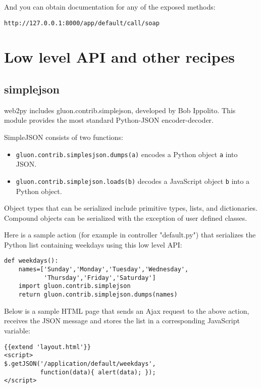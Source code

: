 \documentclass[justified,sixbynine,notoc]{tufte-book}
\def\ft{\small\tt}
\def\inxx#1{\index{#1}}
\begin{document}
\begin{fullwidth}
And you can obtain documentation for any of the exposed methods:

\begin{lstlisting}[keywords={}]
http://127.0.0.1:8000/app/default/call/soap
\end{lstlisting}

\goodbreak\section{Low level API and other recipes}

\goodbreak\subsection{simplejson}

\inxx{JSON} \inxx{simplejson}
\noindent web2py includes gluon.contrib.simplejson, developed by Bob Ippolito. This module provides the most standard Python-JSON encoder-decoder.

SimpleJSON consists of two functions:
\begin{itemize}
\item {\ft gluon.contrib.simplesjson.dumps(a)} encodes a Python object {\ft a} into JSON.

\item {\ft gluon.contrib.simplejson.loads(b)} decodes a JavaScript object {\ft b} into a Python object.
\end{itemize}

Object types that can be serialized include primitive types, lists, and dictionaries. Compound objects can be serialized with the exception of user defined classes.

Here is a sample action (for example in controller "default.py") that serializes the Python list containing weekdays using this low level API:
\begin{lstlisting}
def weekdays():
    names=['Sunday','Monday','Tuesday','Wednesday',
           'Thursday','Friday','Saturday']
    import gluon.contrib.simplejson
    return gluon.contrib.simplejson.dumps(names)
\end{lstlisting}

Below is a sample HTML page that sends an Ajax request to the above action, receives the JSON message and stores the list in a corresponding JavaScript variable:
\begin{lstlisting}[keywords={}]
{{extend 'layout.html'}}
<script>
$.getJSON('/application/default/weekdays',
          function(data){ alert(data); });
</script>
\end{lstlisting}


\end{fullwidth}
\end{document}
